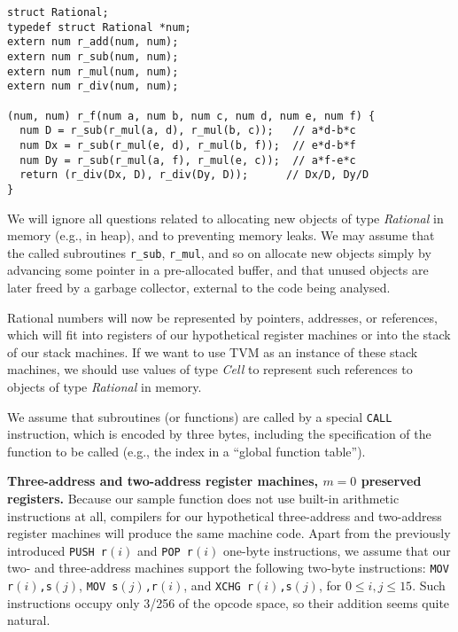 \documentclass[12pt,oneside]{article}
\def\makepoint#1{\medbreak\noindent{\bf #1.\ }}
\def\nxsubpoint{\refstepcounter{subsubsection}%
  \smallbreak\makepoint{\thesubsubsection}}
\def\emb#1{\textbf{#1.}}
\begin{document}
\begin{verbatim}
struct Rational;
typedef struct Rational *num;
extern num r_add(num, num);
extern num r_sub(num, num);
extern num r_mul(num, num);
extern num r_div(num, num);

(num, num) r_f(num a, num b, num c, num d, num e, num f) {
  num D = r_sub(r_mul(a, d), r_mul(b, c));   // a*d-b*c
  num Dx = r_sub(r_mul(e, d), r_mul(b, f));  // e*d-b*f
  num Dy = r_sub(r_mul(a, f), r_mul(e, c));  // a*f-e*c
  return (r_div(Dx, D), r_div(Dy, D));      // Dx/D, Dy/D
}
\end{verbatim}
We will ignore all questions related to allocating new objects of type \textit{Rational\/} in memory (e.g., in heap), and to preventing memory leaks. We may assume that the called subroutines \texttt{r\_sub}, \texttt{r\_mul}, and so on allocate new objects simply by advancing some pointer in a pre-allocated buffer, and that unused objects are later freed by a garbage collector, external to the code being analysed.

Rational numbers will now be represented by pointers, addresses, or references, which will fit into registers of our hypothetical register machines or into the stack of our stack machines. If we want to use TVM as an instance of these stack machines, we should use values of type \textit{Cell} to represent such references to objects of type \textit{Rational} in memory.

We assume that subroutines (or functions) are called by a special \texttt{CALL} instruction, which is encoded by three bytes, including the specification of the function to be called (e.g., the index in a ``global function table'').

\nxsubpoint\label{sp:cmp2.2addr.0}\emb{Three-address and two-address register machines, $m=0$ preserved registers}
Because our sample function does not use built-in arithmetic instructions at all, compilers for our hypothetical three-address and two-address register machines will produce the same machine code. Apart from the previously introduced \texttt{PUSH r$(i)$} and \texttt{POP r$(i)$} one-byte instructions, we assume that our two- and three-address machines support the following two-byte instructions: \texttt{MOV r$(i)$,s$(j)$}, \texttt{MOV s$(j)$,r$(i)$}, and \texttt{XCHG r$(i)$,s$(j)$}, for $0\leq i,j\leq 15$. Such instructions occupy only 3/256 of the opcode space, so their addition seems quite natural.
\end{document}
